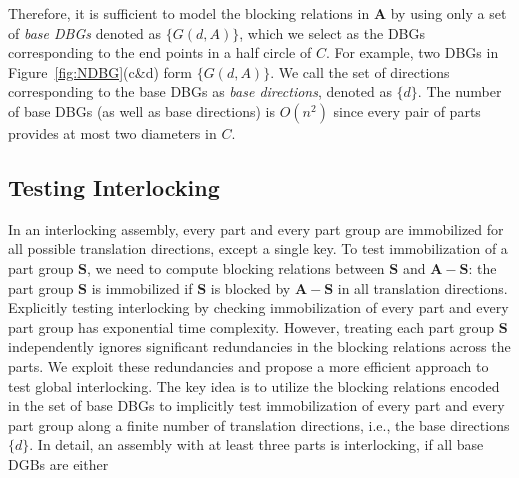 Therefore, it is sufficient to model the blocking relations in $\mathbf{A}$ by using only a set of {\em base DBGs} denoted as $\{G(d, A)\}$, which we select as the DBGs corresponding to the end points in a half circle of $C$.
For example, two DBGs in Figure~\ref{fig:NDBG}(c\&d) form $\{G(d, A)\}$.
We call the set of directions corresponding to the base DBGs as {\em base directions}, denoted as $\{d\}$.
The number of base DBGs (as well as base directions) is $O(n^2)$ since every pair of parts provides at most two diameters in $C$.  





\subsection{Testing Interlocking}
\label{subsec: testinginterlocking}
In an interlocking assembly, every part and every part group are immobilized for all possible translation directions, except a single key.
To test immobilization of a part group $\mathbf{S}$, we need to compute blocking relations between $\mathbf{S}$ and $\mathbf{A}-\mathbf{S}$:  the part group $\mathbf{S}$ is immobilized if $\mathbf{S}$ is blocked by $\mathbf{A}-\mathbf{S}$ in all translation directions.
Explicitly testing interlocking by checking immobilization of every part and every part group has exponential time complexity. 
However, treating each part group $\mathbf{S}$ independently ignores significant redundancies in the blocking relations across the parts.
%
We exploit these redundancies and propose a more efficient approach to test global interlocking. 
The key idea is to utilize the blocking relations encoded in the set of base DBGs to implicitly test immobilization of every part and every part group along a finite number of translation directions, i.e., the base directions $\{d\}$.
In detail, an assembly with at least three parts is interlocking, if all base DGBs are either

